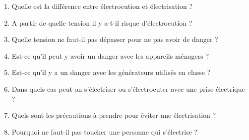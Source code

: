 \documentclass[11pt,a4paper]{article}
\begin{document}
\begin{enumerate}
    \item Quelle est la différence entre électrocution et électrisation ?
    \item A partir de quelle tension il y a-t-il risque d’électrocution ?
    \item Quelle tension ne faut-il pas dépasser pour ne pas avoir de danger ?
    \item Est-ce qu’il peut y avoir un danger avec les appareils ménagers ?
    \item Est-ce qu’il y a un danger avec les générateurs utilisés en classe ?
    \item Dans quels cas peut-on s’électriser ou s’électrocuter avec une prise électrique ?
    \item Quels sont les précautions à prendre pour éviter une électrisation ?
    \item Pourquoi ne faut-il pas toucher une personne qui s’électrise ?
\end{enumerate}
\end{document}
